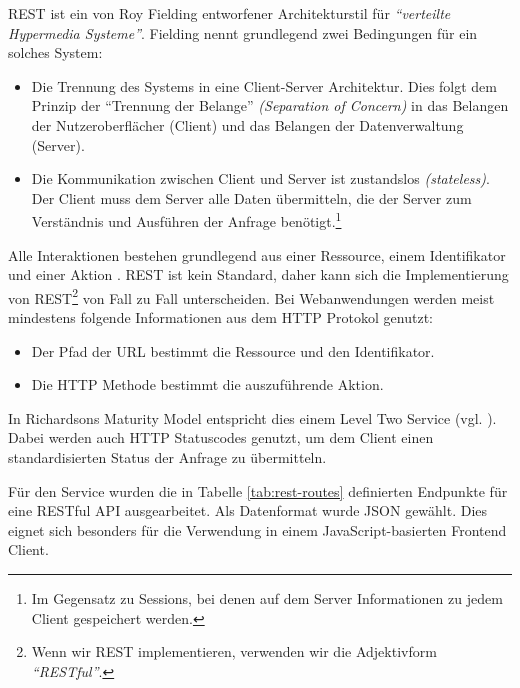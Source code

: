 \ac{REST} ist ein von Roy Fielding entworfener Architekturstil für \emph{``verteilte Hypermedia Systeme''}. Fielding nennt grundlegend zwei Bedingungen für ein solches System:

\begin{itemize}
  \item Die Trennung des Systems in eine Client-Server Architektur. Dies folgt dem Prinzip der ``Trennung der Belange'' \emph{(Separation of Concern)} in das Belangen der Nutzeroberflächer (Client) und das Belangen der Datenverwaltung (Server).
  \item Die Kommunikation zwischen Client und Server ist zustandslos \emph{(stateless)}. Der Client muss dem Server alle Daten übermitteln, die der Server zum Verständnis und Ausführen der Anfrage benötigt.\footnote{Im Gegensatz zu Sessions, bei denen auf dem Server Informationen zu jedem Client gespeichert werden.}
\end{itemize}

Alle Interaktionen bestehen grundlegend aus einer Ressource, einem Identifikator und einer Aktion \citep[12]{Webber2010}. REST ist kein Standard, daher kann sich die Implementierung von REST\footnote{Wenn wir REST implementieren, verwenden wir die Adjektivform \emph{``RESTful''}.} von Fall zu Fall unterscheiden. Bei Webanwendungen werden meist mindestens folgende Informationen aus dem HTTP Protokol genutzt:

\begin{itemize}
  \item Der Pfad der URL bestimmt die Ressource und den Identifikator.
  \item Die HTTP Methode bestimmt die auszuführende Aktion.
\end{itemize}

In Richardsons Maturity Model entspricht dies einem Level Two Service (vgl. \citep[20]{Webber2010}). Dabei werden auch HTTP Statuscodes genutzt, um dem Client einen standardisierten Status der Anfrage zu übermitteln.

Für den Service wurden die in Tabelle \ref{tab:rest-routes} definierten Endpunkte für eine RESTful API ausgearbeitet. Als Datenformat wurde JSON gewählt. Dies eignet sich besonders für die Verwendung in einem JavaScript-basierten Frontend Client.

